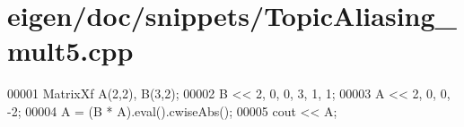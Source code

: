 \hypertarget{eigen_2doc_2snippets_2_topic_aliasing__mult5_8cpp_source}{}\section{eigen/doc/snippets/\+Topic\+Aliasing\+\_\+mult5.cpp}
\label{eigen_2doc_2snippets_2_topic_aliasing__mult5_8cpp_source}

\begin{DoxyCode}
00001 MatrixXf A(2,2), B(3,2);
00002 B << 2, 0,  0, 3, 1, 1;
00003 A << 2, 0, 0, -2;
00004 A = (B * A).eval().cwiseAbs();
00005 cout << A;
\end{DoxyCode}
